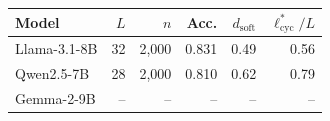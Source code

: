 \begin{tabular}{lrrrrr}
\toprule
Model & $L$ & $n$ & Acc. & $d_{\mathrm{soft}}$ & $\ell^*_{\mathrm{cyc}}/L$ \\
\midrule
Llama-3.1-8B & 32 & 2{,}000 & 0.831 & 0.49 & 0.56 \\
Qwen2.5-7B & 28 & 2{,}000 & 0.810 & 0.62 & 0.79 \\
Gemma-2-9B & -- & -- & -- & -- & -- \\
\bottomrule
\end{tabular}
